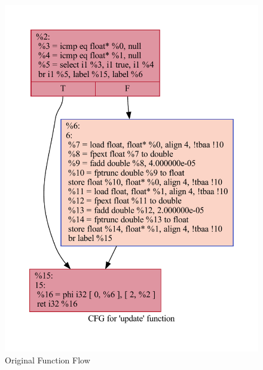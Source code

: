 \begin{figure}[t]
  \includegraphics[width=1\textwidth]{./images/update.pdf}
  \caption{Original Function Flow}
\end{figure}

